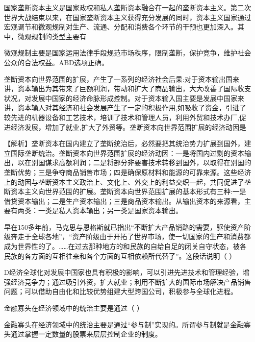 \question 国家垄断资本主义是国家政权和私人垄断资本融合在一起的垄断资本主义。第二次世界大战结束以来，在国家垄断资本主义获得充分发展的同时，资本主义国家通过宏观调节和微观规制对生产、流通、分配和消费各个环节的干预也更加深入。其中，微观规制的类型主要有
\par{}
\begin{solution}微观规制主要是国家运用法律手段规范市场秩序，限制垄断，保护竞争，维护社会公众的合法权益。ABD选项正确。
\end{solution}
\question 垄断资本向世界范围的扩展，产生了一系列的经济社会后果:对于资本输出国来讲，资本输出为其带来了巨额利润，带动和扩大了商品输出，大大改善了国际收支状况，对发展中国家的经济命脉形成控制。对于资本输入国主要是发展中国家来讲，资本输人对其经济和社会发展产生了一定的积极作用,如吸收了资金，引进了较先进的机器设备和工艺技术，培训了技术和管理人员，利用外贸和技术办厂,促进经济发展，增加了就业,扩大了外贸等。垄断资本向世界范围扩展的经济动因是
\par\fourch{\textcolor{red}{将国内过剩的资本输出，以在别国谋求高额利润}}{\textcolor{red}{将部分非要害技术转移到国外，以取得在别国的垄断优势}}{\textcolor{red}{争夺商品销售市场}}{\textcolor{red}{确保原材料和能源的可靠来源}}
\begin{solution}【解析】垄断资本在国内建立了垄断统治后，必然要把其统治势力扩展到国外，建立国际垄断统治。垄断资本向世界范围扩展的经济动因：一是将国内过剩的资本输出，以在别国谋求高额利润；二是将部分非要害技术转移到国外，以取得在别国的垄断优势；三是争夺商品销售市场；四是确保原材料和能源的可靠来源。这些经济上的动因与垄断资本主义政治上、文化上、外交上的利益交织一起，共同促进了垄断资本主义向世界范围的扩展。垄断资本向世界范围扩展的基本形式有三种:一是借贷资本输出；二是生产资本输出；三是商品资本输出。从输出资本的来源看，主要有两类：一类是私人资本输出；另一类是国家资本输出。
\end{solution}
\question 早在150多年前，马克思与恩格斯就已指出``不断扩大产品销路的需要，驱使资产阶级奔走于全球各地''，``资产阶级由于开拓了世界市场，使一切国家的生产和消费都成为世界性的了。\ldots{}\ldots{}在过去那种地方的和民族的自给自足的闭关自守状态，被各民族的各方面的互相往来和各个方面的互相依赖所代替了''。这段话说明（
）
\par{}
\begin{solution}D经济全球化对发展中国家也具有积极的影响，可以引进先进技术和管理经验，增强经济竞争力；通过吸引外资，扩大就业；利用不断扩大的国际市场解决产品销售问题；可以借助自由化和比较优势组建大型跨国公司，积极参与全球化进程。
\end{solution}
\question 金融寡头在经济领域中的统治主要是通过（ ）
\par{}
\begin{solution}金融寡头在经济领域中的统治主要是通过``参与制''实现的。所谓参与制就是金融寡头通过掌握一定数量的股票来层层控制企业的制度。
\end{solution}
